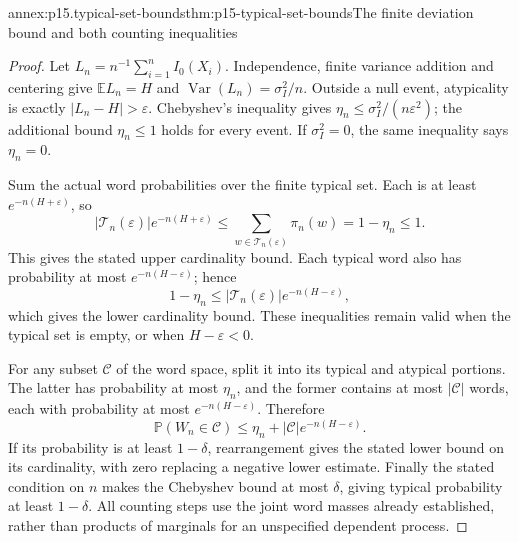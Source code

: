 \begin{annexitem}{annex:p15.typical-set-bounds}{thm:p15-typical-set-bounds}{The finite deviation bound and both counting inequalities}
\begin{proof}
Let \(L_n=n^{-1}\sum_{i=1}^nI_0(X_i)\).
Independence, finite variance addition and centering give
\(\mathbb EL_n=H\) and \(\operatorname{Var}(L_n)=\sigma_I^2/n\).
Outside a null event, atypicality is exactly \(|L_n-H|>\varepsilon\).
Chebyshev's inequality gives
\(\eta_n\leq\sigma_I^2/(n\varepsilon^2)\); the additional bound
\(\eta_n\leq1\) holds for every event. If \(\sigma_I^2=0\),
the same inequality says \(\eta_n=0\).

Sum the actual word probabilities over the finite typical set.
Each is at least \(e^{-n(H+\varepsilon)}\), so
\[
 |\mathcal T_n(\varepsilon)|e^{-n(H+\varepsilon)}
    \leq\sum_{w\in\mathcal T_n(\varepsilon)}\pi_n(w)
    =1-\eta_n\leq1.
\]
This gives the stated upper cardinality bound.
Each typical word also has probability at most \(e^{-n(H-\varepsilon)}\);
hence
\[
 1-\eta_n
   \leq|\mathcal T_n(\varepsilon)|e^{-n(H-\varepsilon)},
\]
which gives the lower cardinality bound. These inequalities remain
valid when the typical set is empty, or when \(H-\varepsilon<0\).

For any subset \(\mathcal C\) of the word space, split it into its
typical and atypical portions. The latter has probability at most
\(\eta_n\), and the former contains at most \(|\mathcal C|\)
words, each with probability at most \(e^{-n(H-\varepsilon)}\).
Therefore
\[
 \mathbb P(W_n\in\mathcal C)
       \leq\eta_n+|\mathcal C|e^{-n(H-\varepsilon)}.
\]
If its probability is at least \(1-\delta\), rearrangement gives
the stated lower bound on its cardinality, with zero replacing a
negative lower estimate. Finally the stated condition on \(n\)
makes the Chebyshev bound at most \(\delta\), giving typical
probability at least \(1-\delta\). All counting steps use the
joint word masses already established, rather than products of
marginals for an unspecified dependent process.
\end{proof}
\end{annexitem}

